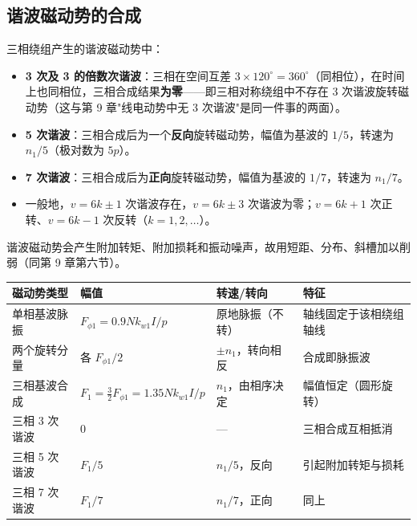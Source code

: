 \subsection{谐波磁动势的合成}
三相绕组产生的谐波磁动势中：
\begin{itemize}
  \item \textbf{3 次及 3 的倍数次谐波}：三相在空间互差 $3\times120^\circ=360^\circ$（同相位），在时间上也同相位，三相合成结果\textbf{为零}——即三相对称绕组中不存在 3 次谐波旋转磁动势（这与第 9 章"线电动势中无 3 次谐波"是同一件事的两面）。
  \item \textbf{5 次谐波}：三相合成后为一个\textbf{反向}旋转磁动势，幅值为基波的 $1/5$，转速为 $n_1/5$（极对数为 $5p$）。
  \item \textbf{7 次谐波}：三相合成后为\textbf{正向}旋转磁动势，幅值为基波的 $1/7$，转速为 $n_1/7$。
  \item 一般地，$v=6k\pm1$ 次谐波存在，$v=6k\pm3$ 次谐波为零；$v=6k+1$ 次正转、$v=6k-1$ 次反转（$k=1,2,\dots$）。
\end{itemize}
谐波磁动势会产生附加转矩、附加损耗和振动噪声，故用短距、分布、斜槽加以削弱（同第 9 章第六节）。

\begin{center}
\begin{tabular}{@{}p{1.6cm}p{2.6cm}p{2.6cm}p{3.4cm}@{}}
\toprule
磁动势类型 & 幅值 & 转速/转向 & 特征 \\
\midrule
单相基波脉振 & $F_{\phi1}=0.9Nk_{w1}I/p$ & 原地脉振（不转） & 轴线固定于该相绕组轴线 \\
两个旋转分量 & 各 $F_{\phi1}/2$ & $\pm n_1$，转向相反 & 合成即脉振波 \\
三相基波合成 & $F_1=\tfrac32F_{\phi1}=1.35Nk_{w1}I/p$ & $n_1$，由相序决定 & 幅值恒定（圆形旋转） \\
三相 3 次谐波 & 0 & — & 三相合成互相抵消 \\
三相 5 次谐波 & $F_1/5$ & $n_1/5$，反向 & 引起附加转矩与损耗 \\
三相 7 次谐波 & $F_1/7$ & $n_1/7$，正向 & 同上 \\
\bottomrule
\end{tabular}
\end{center}

